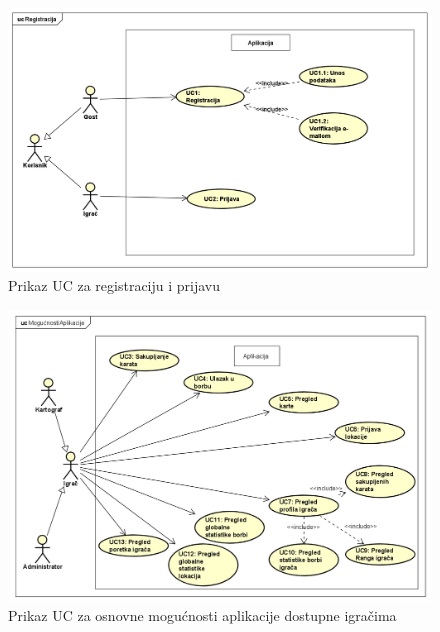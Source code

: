 		\begin{figure}[H]
			\includegraphics[width=\textwidth]{slike/UCRegistracija.png} %
			\caption{Prikaz UC za registraciju i prijavu}
			\label{fig:UCregistracija} %
		\end{figure}
\pagebreak

		\begin{figure}[H]
			\includegraphics[width=\textwidth]{slike/UCMogucnostiAplikacije.png} %
			\caption{Prikaz UC za osnovne mogućnosti aplikacije dostupne igračima}
			\label{fig:UCmogucnostiAplikacije} %
		\end{figure}
\pagebreak

